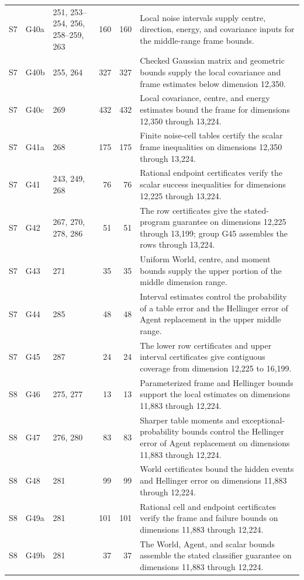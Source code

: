 \begin{longtable}{@{}l l p{} r r p{}@{}}
S7 & G40a & \raggedright 251, 253--254, 256, 258--259, 263 & 160 & 160 & \raggedright Local noise intervals supply centre, direction, energy, and covariance inputs for the middle-range frame bounds. \tabularnewline
S7 & G40b & \raggedright 255, 264 & 327 & 327 & \raggedright Checked Gaussian matrix and geometric bounds supply the local covariance and frame estimates below dimension 12{,}350. \tabularnewline
S7 & G40c & \raggedright 269 & 432 & 432 & \raggedright Local covariance, centre, and energy estimates bound the frame for dimensions 12{,}350 through 13{,}224. \tabularnewline
S7 & G41a & \raggedright 268 & 175 & 175 & \raggedright Finite noise-cell tables certify the scalar frame inequalities on dimensions 12{,}350 through 13{,}224. \tabularnewline
S7 & G41 & \raggedright 243, 249, 268 & 76 & 76 & \raggedright Rational endpoint certificates verify the scalar success inequalities for dimensions 12{,}225 through 13{,}224. \tabularnewline
S7 & G42 & \raggedright 267, 270, 278, 286 & 51 & 51 & \raggedright The row certificates give the stated-program guarantee on dimensions 12{,}225 through 13{,}199; group G45 assembles the rows through 13{,}224. \tabularnewline
S7 & G43 & \raggedright 271 & 35 & 35 & \raggedright Uniform World, centre, and moment bounds supply the upper portion of the middle dimension range. \tabularnewline
S7 & G44 & \raggedright 285 & 48 & 48 & \raggedright Interval estimates control the probability of a table error and the Hellinger error of Agent replacement in the upper middle range. \tabularnewline
S7 & G45 & \raggedright 287 & 24 & 24 & \raggedright The lower row certificates and upper interval certificates give contiguous coverage from dimension 12{,}225 to 16{,}199. \tabularnewline
S8 & G46 & \raggedright 275, 277 & 13 & 13 & \raggedright Parameterized frame and Hellinger bounds support the local estimates on dimensions 11{,}883 through 12{,}224. \tabularnewline
S8 & G47 & \raggedright 276, 280 & 83 & 83 & \raggedright Sharper table moments and exceptional-probability bounds control the Hellinger error of Agent replacement on dimensions 11{,}883 through 12{,}224. \tabularnewline
S8 & G48 & \raggedright 281 & 99 & 99 & \raggedright World certificates bound the hidden events and Hellinger error on dimensions 11{,}883 through 12{,}224. \tabularnewline
S8 & G49a & \raggedright 281 & 101 & 101 & \raggedright Rational cell and endpoint certificates verify the frame and failure bounds on dimensions 11{,}883 through 12{,}224. \tabularnewline
S8 & G49b & \raggedright 281 & 37 & 37 & \raggedright The World, Agent, and scalar bounds assemble the stated classifier guarantee on dimensions 11{,}883 through 12{,}224. \tabularnewline

\end{longtable}
